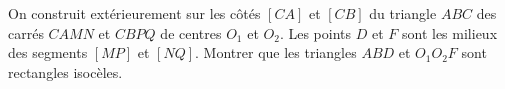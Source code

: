 On construit extérieurement sur les côtés $[CA]$ et $[CB]$ du triangle $ABC$ des carrés $CAMN$ et $CBPQ$ de centres $O_1$ et $O_2$. Les points $D$ et $F$ sont les milieux des segments $[MP]$ et $[NQ]$. Montrer que les triangles $ABD$ et $O_1O_2F$ sont rectangles isocèles.
